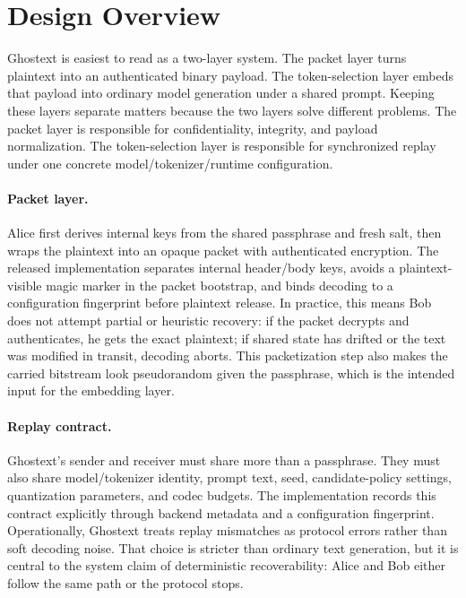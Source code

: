 \section{Design Overview}

Ghostext is easiest to read as a two-layer system. The packet layer turns plaintext into an authenticated binary payload. The token-selection layer embeds that payload into ordinary model generation under a shared prompt. Keeping these layers separate matters because the two layers solve different problems. The packet layer is responsible for confidentiality, integrity, and payload normalization. The token-selection layer is responsible for synchronized replay under one concrete model/tokenizer/runtime configuration.

\paragraph{Packet layer.} Alice first derives internal keys from the shared passphrase and fresh salt, then wraps the plaintext into an opaque packet with authenticated encryption. The released implementation separates internal header/body keys, avoids a plaintext-visible magic marker in the packet bootstrap, and binds decoding to a configuration fingerprint before plaintext release. In practice, this means Bob does not attempt partial or heuristic recovery: if the packet decrypts and authenticates, he gets the exact plaintext; if shared state has drifted or the text was modified in transit, decoding aborts. This packetization step also makes the carried bitstream look pseudorandom given the passphrase, which is the intended input for the embedding layer.

\paragraph{Replay contract.} Ghostext's sender and receiver must share more than a passphrase. They must also share model/tokenizer identity, prompt text, seed, candidate-policy settings, quantization parameters, and codec budgets. The implementation records this contract explicitly through backend metadata and a configuration fingerprint. Operationally, Ghostext treats replay mismatches as protocol errors rather than soft decoding noise. That choice is stricter than ordinary text generation, but it is central to the system claim of deterministic recoverability: Alice and Bob either follow the same path or the protocol stops.

